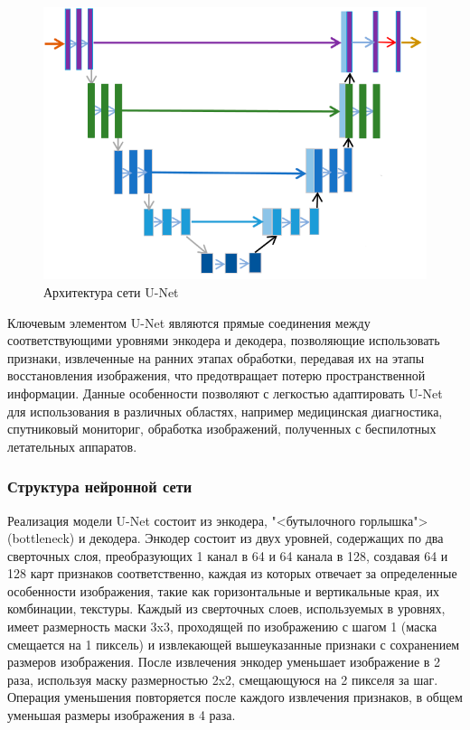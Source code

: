 \begin{figure}[h]
	\centering
	\includegraphics[width=0.85\linewidth]{images/unet}
	\caption{Архитектура сети U-Net}
	\label{fig:unet}
\end{figure}

Ключевым элементом U-Net являются прямые соединения между соответствующими уровнями энкодера и декодера, позволяющие использовать признаки, извлеченные на ранних этапах обработки, передавая их на этапы восстановления изображения, что предотвращает потерю пространственной информации. Данные особенности позволяют с легкостью адаптировать U-Net для использования в различных областях, например медицинская диагностика, спутниковый мониториг, обработка изображений, полученных с беспилотных летательных аппаратов.

\subsubsection{Структура нейронной сети}

Реализация модели U-Net состоит из энкодера, "<бутылочного горлышка"> (bottleneck) и декодера. Энкодер состоит из двух уровней, содержащих по два сверточных слоя, преобразующих 1 канал в 64 и 64 канала в 128, создавая 64 и 128 карт признаков соответственно, каждая из которых отвечает за определенные особенности изображения, такие как горизонтальные и вертикальные края, их комбинации, текстуры. Каждый из сверточных слоев, используемых в уровнях, имеет размерность маски 3x3, проходящей по изображению с шагом 1 (маска смещается на 1 пиксель) и извлекающей вышеуказанные признаки с сохранением размеров изображения. После извлечения энкодер уменьшает изображение в 2 раза, используя маску размерностью 2x2, смещающуюся на 2 пикселя за шаг. Операция уменьшения повторяется после каждого извлечения признаков, в общем уменьшая размеры изображения в 4 раза.

